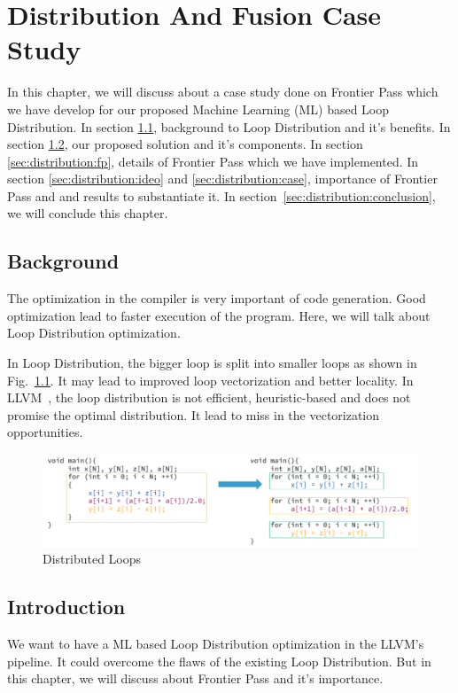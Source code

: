 \chapter{Distribution And Fusion Case Study}
\label{chap:ch4}

In this chapter, we will discuss about a case study done on Frontier Pass which we have develop for our proposed Machine Learning (ML) based Loop Distribution. In section \ref{sec:distribution:bg}, background to Loop Distribution and it's benefits. In section \ref{sec:distribution:intro}, our proposed solution and it's components. In section \ref{sec:distribution:fp}, details of Frontier Pass which we have implemented. In section \ref{sec:distribution:ideo} and \ref{sec:distribution:case}, importance of  Frontier Pass and and results to substantiate it. In section~\ref{sec:distribution:conclusion}, we will conclude this chapter.


\section{Background}\label{sec:distribution:bg}
    The optimization in the compiler is very important of code generation.
Good optimization lead to faster execution of the program. Here, we will talk about Loop Distribution optimization.

    In Loop Distribution, the bigger loop is split into smaller loops as shown in Fig.~\ref{fig:dist-introduction}. It may lead to improved loop vectorization and better locality. In LLVM~\cite{Lattner:2004:llvm}, the loop distribution is not efficient, heuristic-based and does not promise the optimal distribution. It lead to miss in the vectorization opportunities.

\begin{figure}[t]
    \centering
    \includegraphics[scale=0.45]{figures/chapter-4/distribution_introduction.png}
    \caption{Distributed Loops}
     \label{fig:dist-introduction}
\end{figure}

\section{Introduction}\label{sec:distribution:intro}
We want to have a ML based Loop Distribution optimization in the LLVM's pipeline. It could overcome the flaws of the existing Loop Distribution. But in this chapter, we will discuss about Frontier Pass and it's importance.

